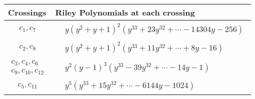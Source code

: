 \documentclass[1p]{elsarticle_modified}
\theoremstyle{definition}
\begin{document}
\begin{tabular}{m{50pt}|m{274pt}}
Crossings & \hspace{64pt}Riley Polynomials at each crossing \\
\hline $$\begin{aligned}c_{1},c_{7}\end{aligned}$$&$\begin{aligned}
&y(y^2+y+1)^2(y^{33}+23 y^{32}+\cdots-14304 y-256)
\end{aligned}$\\
\hline $$\begin{aligned}c_{2},c_{8}\end{aligned}$$&$\begin{aligned}
&y(y^2+y+1)^2(y^{33}+11 y^{32}+\cdots+8 y-16)
\end{aligned}$\\
\hline $$\begin{aligned}c_{3},c_{4},c_{6}\\c_{9},c_{10},c_{12}\end{aligned}$$&$\begin{aligned}
&y^2(y-1)^3(y^{33}-39 y^{32}+\cdots-14 y-1)
\end{aligned}$\\
\hline $$\begin{aligned}c_{5},c_{11}\end{aligned}$$&$\begin{aligned}
&y^5(y^{33}+15 y^{32}+\cdots-6144 y-1024)
\end{aligned}$\\
\hline
\end{tabular}
\vskip 2pc
\end{document}
